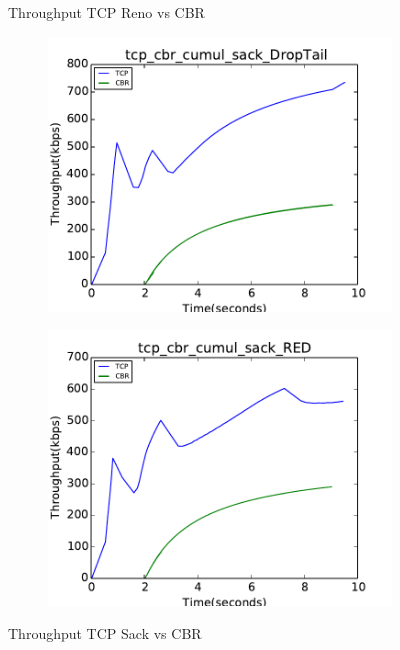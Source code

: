 \documentclass[USenglish,oneside,twocolumn]{article}
\begin{document}
\begin{figure}[h]
\begin{subfigure}{0.48\linewidth}
    \end{subfigure}
\caption{Throughput TCP Reno vs CBR}
\label{bw_reno}
\end{figure}

\begin{figure}
\captionsetup{justification=centering}
    \centering
    \begin{subfigure}{0.5\linewidth}
        \centering
        \includegraphics[width=\linewidth]{fig/tcp_cbr_cumul_3mb_sack_DropTail.pdf} %
    \end{subfigure}
    \begin{subfigure}{0.48\linewidth}
        \centering
        \includegraphics[width=\linewidth]{fig/tcp_cbr_cumul_3mb_sack_RED.pdf} %
    \end{subfigure}
\caption{Throughput TCP Sack vs CBR}
\label{bw_sack}
\end{figure}
\end{document}
